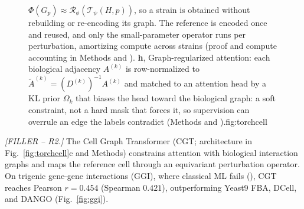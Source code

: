 \begin{figure}[t]
{$\Phi(G_p)\approx\mathcal{R}_\phi(\mathcal{T}_\psi(H,p))$, so a strain is obtained without
rebuilding or re-encoding its graph. The reference is encoded once and reused, and only the
small-parameter operator runs per perturbation, amortizing compute across strains (proof and
compute accounting in Methods and ).
\textbf{h}, Graph-regularized attention: each biological adjacency $A^{(k)}$ is row-normalized to
$\tilde{A}^{(k)}=(D^{(k)})^{-1}A^{(k)}$ and matched to an attention head by a KL prior
$\Omega_k$ that biases the head toward the biological graph: a soft constraint, not a hard
mask that forces it, so supervision can overrule an edge the labels contradict (Methods and
).}{fig:torchcell}
\end{figure}
\FloatBarrier

\textit{[FILLER -- R2.]} The Cell Graph Transformer (CGT; architecture in
Fig.~\ref{fig:torchcell}c and Methods) constrains attention with biological interaction
graphs and maps the reference cell through an equivariant perturbation operator. On
trigenic gene-gene interactions (GGI), where classical ML fails (), CGT
reaches Pearson $r = 0.454$ (Spearman $0.421$), outperforming Yeast9 FBA, DCell, and DANGO
(Fig.~\ref{fig:ggi}).

